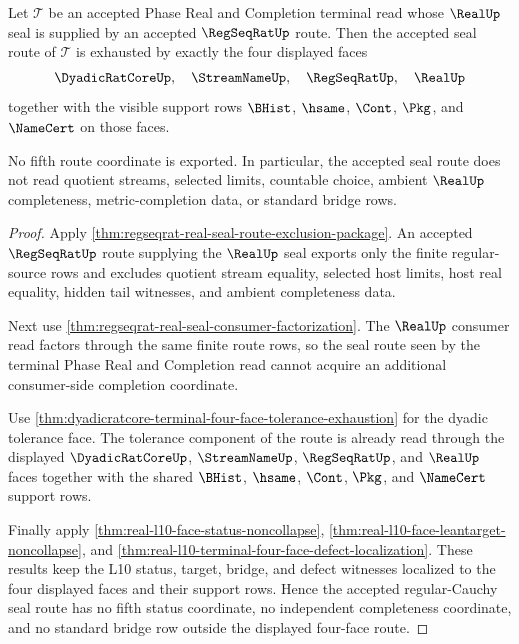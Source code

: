 \begin{theorem}
\label{thm:real-l10-regular-cauchy-seal-route-completeness}
Let $\mathcal T$ be an accepted Phase Real and Completion terminal read whose
$\RealUp$ seal is supplied by an accepted $\RegSeqRatUp$ route. Then the
accepted seal route of $\mathcal T$ is exhausted by exactly the four displayed
faces
$$
\begin{gathered}
\DyadicRatCoreUp,\quad \StreamNameUp,\quad \RegSeqRatUp,\quad \RealUp
\end{gathered}
$$
together with the visible support rows $\BHist$, $\hsame$, $\Cont$, $\Pkg$,
and $\NameCert$ on those faces.

No fifth route coordinate is exported. In particular, the accepted seal route
does not read quotient streams, selected limits, countable choice, ambient
$\RealUp$ completeness, metric-completion data, or standard bridge rows.
\end{theorem}
\begin{proof}
Apply \autoref{thm:regseqrat-real-seal-route-exclusion-package}. An accepted
$\RegSeqRatUp$ route supplying the $\RealUp$ seal exports only the finite
regular-source rows and excludes quotient stream equality, selected host
limits, host real equality, hidden tail witnesses, and ambient completeness
data.

Next use \autoref{thm:regseqrat-real-seal-consumer-factorization}. The
$\RealUp$ consumer read factors through the same finite route rows, so the
seal route seen by the terminal Phase Real and Completion read cannot acquire
an additional consumer-side completion coordinate.

Use \autoref{thm:dyadicratcore-terminal-four-face-tolerance-exhaustion} for
the dyadic tolerance face. The tolerance component of the route is already
read through the displayed $\DyadicRatCoreUp$, $\StreamNameUp$,
$\RegSeqRatUp$, and $\RealUp$ faces together with the shared $\BHist$,
$\hsame$, $\Cont$, $\Pkg$, and $\NameCert$ support rows.

Finally apply \autoref{thm:real-l10-face-status-noncollapse},
\autoref{thm:real-l10-face-leantarget-noncollapse}, and
\autoref{thm:real-l10-terminal-four-face-defect-localization}. These results
keep the L10 status, target, bridge, and defect witnesses localized to the
four displayed faces and their support rows. Hence the accepted regular-Cauchy
seal route has no fifth status coordinate, no independent completeness
coordinate, and no standard bridge row outside the displayed four-face route.
\end{proof}
